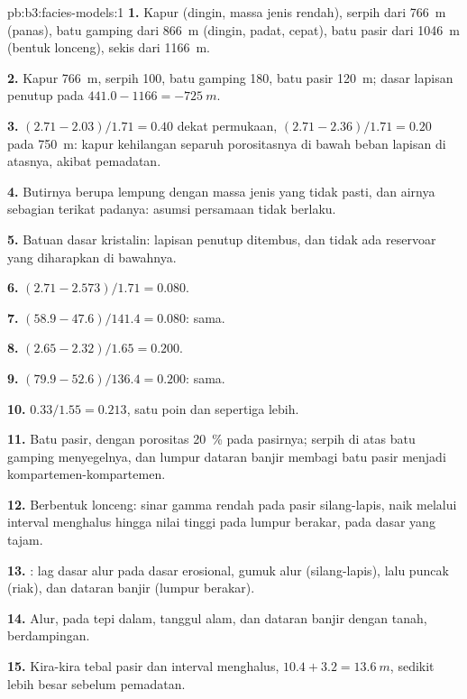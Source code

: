 \begin{solution}{pb:b3:facies-models:1}
\textbf{1.} Kapur (dingin, massa jenis rendah), serpih dari \qty{766}{m} (panas), batu gamping dari
\qty{866}{m} (dingin, padat, cepat), batu pasir dari \qty{1046}{m} (bentuk
lonceng), sekis dari \qty{1166}{m}.

\textbf{2.} Kapur \qty{766}{m}, serpih 100, batu gamping 180, batu pasir
\qty{120}{m}; dasar lapisan penutup pada $441.0 - 1166 = \qty{-725}{m}$.

\textbf{3.} $(2.71 - 2.03)/1.71 = 0.40$ dekat permukaan, $(2.71 -
2.36)/1.71 = 0.20$ pada \qty{750}{m}: kapur kehilangan separuh porositasnya
di bawah beban lapisan di atasnya, akibat pemadatan.

\textbf{4.} Butirnya berupa lempung dengan massa jenis yang tidak pasti, dan airnya
sebagian terikat padanya: asumsi persamaan tidak berlaku.

\textbf{5.} Batuan dasar kristalin: lapisan penutup ditembus, dan tidak ada reservoar
yang diharapkan di bawahnya.

\textbf{6.} $(2.71 - 2.573)/1.71 = 0.080$.

\textbf{7.} $(58.9 - 47.6)/141.4 = 0.080$: sama.

\textbf{8.} $(2.65 - 2.32)/1.65 = 0.200$.

\textbf{9.} $(79.9 - 52.6)/136.4 = 0.200$: sama.

\textbf{10.} $0.33/1.55 = 0.213$, satu poin dan sepertiga lebih.

\textbf{11.} Batu pasir, dengan porositas \qty{20}{\percent} pada pasirnya;
serpih di atas batu gamping menyegelnya, dan lumpur dataran banjir membagi
batu pasir menjadi kompartemen-kompartemen.

\textbf{12.} Berbentuk lonceng: sinar gamma rendah pada pasir silang-lapis,
naik melalui interval menghalus hingga nilai tinggi pada lumpur berakar, pada dasar yang tajam.

\textbf{13.} : lag dasar alur pada dasar erosional,
gumuk alur (silang-lapis), lalu puncak  (riak), dan dataran banjir
(lumpur berakar).

\textbf{14.} Alur,  pada tepi dalam, tanggul alam, dan dataran
banjir dengan tanah, berdampingan.

\textbf{15.} Kira-kira tebal pasir dan interval menghalus, $10.4 + 3.2 =
\qty{13.6}{m}$, sedikit lebih besar sebelum pemadatan.


\end{solution}
